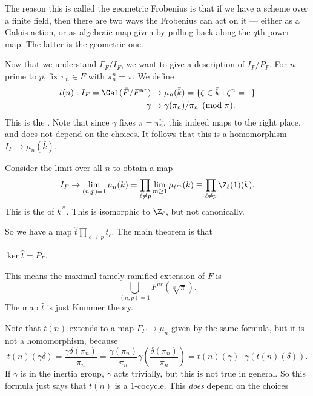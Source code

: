 \documentclass[a4paper]{article}
\begin{document}
The reason this is called the geometric Frobenius is that if we have a scheme over a finite field, then there are two ways the Frobenius can act on it --- either as a Galois action, or as algebraic map given by pulling back along the $q$th power map. The latter is the geometric one.

Now that we understand $\Gamma_F/I_F$, we want to give a description of $I_F/P_F$. For $n$ prime to $p$, fix $\pi_n \in \bar{F}$ with $\pi_n^n = \pi$. We define
\begin{align*}
  t(n): I_F = \Gal(\bar{F}/F^{ur}) &\to \mu_n(\bar{k}) = \{\zeta \in \bar{k}: \zeta^n =1 \}\\
  \gamma &\mapsto \gamma(\pi_n)/\pi_n\pmod \pi.
\end{align*}
This is the . Note that since $\gamma$ fixes $\pi = \pi_n^n$, this indeed maps to the right place, and does not depend on the choices. It follows that this is a homomorphism $I_F \to \mu_n(\bar{k})$.

Consider the limit over all $n$ to obtain a map
\[
  I_F \to \lim_{(n, p) = 1} \mu_n(\bar{k}) = \prod_{\ell \not= p} \lim_{m \geq 1} \mu_{\ell^m}(\bar{k}) \equiv \prod_{\ell \not= p} \Z_{\ell}(1)(\bar{k}).
\]
This  is the  of $\bar{k}^{\times}$. This is isomorphic to $\Z_{\ell}$, but not canonically.

So we have a map $\hat{t} \prod_{\ell \not= p} t_\ell$. The main theorem is that
\begin{prop}
  $\ker \hat{t} = P_F$.
\end{prop}
This means the maximal tamely ramified extension of $F$ is
\[
  \bigcup_{(n, p) = 1} F^{ur} (\sqrt[n]{\pi}).
\]
The map $\hat{t}$ is just Kummer theory.

Note that $t(n)$ extends to a map $\Gamma_F \to \mu_n$ given by the same formula, but it is not a homomorphism, because
\[
  t(n)(\gamma \delta) = \frac{\gamma\delta(\pi_n)}{\pi_n} = \frac{\gamma(\pi_n)}{\pi_n} \gamma \left(\frac{\delta(\pi_n)}{\pi_n}\right) = t(n)(\gamma) \cdot \gamma(t(n)(\delta)).
\]
If $\gamma$ is in the inertia group, $\gamma$ acts trivially, but this is not true in general. So this formula just says that $t(n)$ is a $1$-cocycle. This \emph{does} depend on the choices
\end{document}
